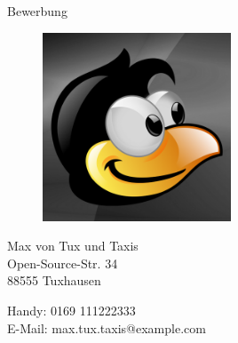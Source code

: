 \documentclass[12pt,a4paper]{article}
\begin{document}
\centering
\Huge Bewerbung

\vfill

\begin{figure}[H]
	\centering
 	\includegraphics[width=0.5\textwidth]{bild.png}
\end{figure}

\vfill

\normalsize

Max von Tux und Taxis \\
Open-Source-Str. 34 \\
88555 Tuxhausen

\vspace{1em}

Handy: 0169 111222333 \\
E-Mail: max.tux.taxis@example.com
\end{document}
